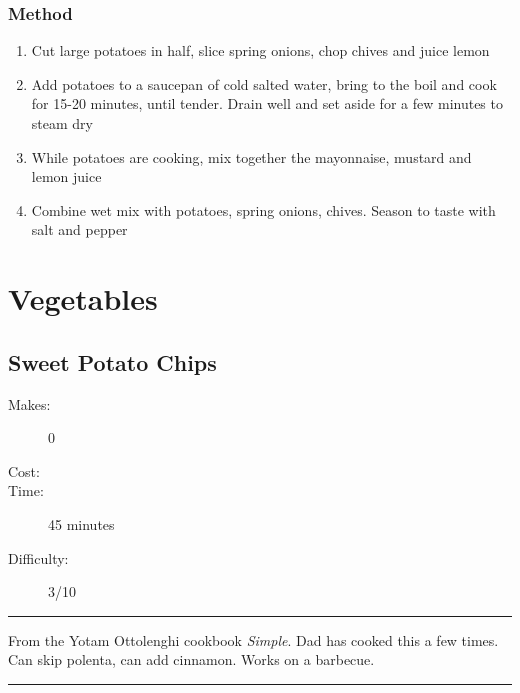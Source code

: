 \documentclass[]{article}
\begin{document}
\subsubsection*{\Large Method}
\begin{enumerate}[font=\huge\color{accent}]
	\item Cut large potatoes in half, slice spring onions, chop chives and juice lemon
	\item Add potatoes to a saucepan of cold salted water, bring to the boil and cook for 15-20 minutes, until tender. Drain well and set aside for a few minutes to steam dry
	\item While potatoes are cooking, mix together the mayonnaise, mustard and lemon juice
	\item Combine wet mix with potatoes, spring onions, chives. Season to taste with salt and pepper
\end{enumerate}
\newpage
{}
\section*{\center\Huge\color{accent}Vegetables}
\label{cat:Vegetables}
\label{rec:Sweet Potato Chips}
\subsection*{\center\huge Sweet Potato Chips}
\begin{description}
\item[Makes:] 0 
\item[Cost:] \textdollar
\item[Time:] 45 minutes
\item[Difficulty:] 3/10
\end{description}
\vspace{0.2cm}\hrule\vspace{0.5cm}
\begin{adjustwidth}{0.5 cm}{0.5 cm}

From the Yotam Ottolenghi cookbook \textit{Simple}. Dad has cooked this a few times. Can skip polenta, can add cinnamon. Works on a barbecue. \hfill\color{accent}{\Large\faVimeoSquare\hspace{0.1cm}\faTruck\hspace{0.1cm}}\color{black}

\end{adjustwidth}
\vspace{0.5cm}\hrule
\end{document}
